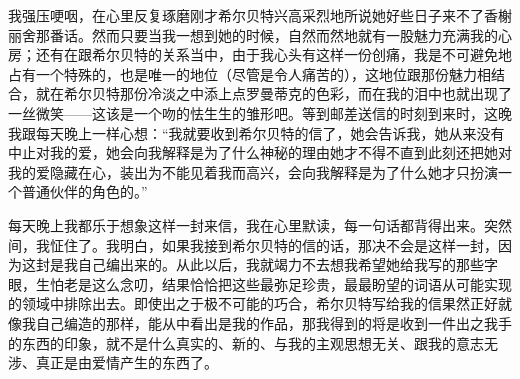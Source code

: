 \par 我强压哽咽，在心里反复琢磨刚才希尔贝特兴高采烈地所说她好些日子来不了香榭丽舍那番话。然而只要当我一想到她的时候，自然而然地就有一股魅力充满我的心房；还有在跟希尔贝特的关系当中，由于我心头有这样一份创痛，我是不可避免地占有一个特殊的，也是唯一的地位（尽管是令人痛苦的），这地位跟那份魅力相结合，就在希尔贝特那份冷淡之中添上点罗曼蒂克的色彩，而在我的泪中也就出现了一丝微笑——这该是一个吻的怯生生的雏形吧。等到邮差送信的时刻到来时，这晚我跟每天晚上一样心想：“我就要收到希尔贝特的信了，她会告诉我，她从来没有中止对我的爱，她会向我解释是为了什么神秘的理由她才不得不直到此刻还把她对我的爱隐藏在心，装出为不能见着我而高兴，会向我解释是为了什么她才只扮演一个普通伙伴的角色的。”
\par 每天晚上我都乐于想象这样一封来信，我在心里默读，每一句话都背得出来。突然间，我怔住了。我明白，如果我接到希尔贝特的信的话，那决不会是这样一封，因为这封是我自己编出来的。从此以后，我就竭力不去想我希望她给我写的那些字眼，生怕老是这么念叨，结果恰恰把这些最弥足珍贵，最最盼望的词语从可能实现的领域中排除出去。即使出之于极不可能的巧合，希尔贝特写给我的信果然正好就像我自己编造的那样，能从中看出是我的作品，那我得到的将是收到一件出之我手的东西的印象，就不是什么真实的、新的、与我的主观思想无关、跟我的意志无涉、真正是由爱情产生的东西了。
